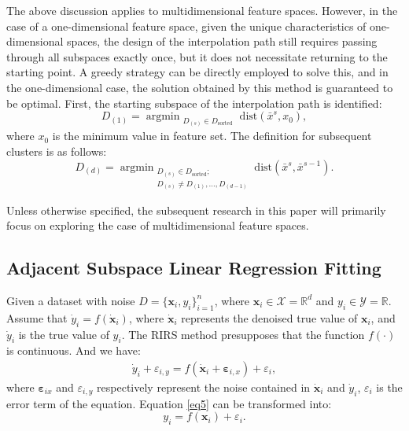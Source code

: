 \documentclass[final,3p,times]{elsarticle}
\begin{document}
The above discussion applies to multidimensional feature spaces. 
However, in the case of a one-dimensional feature space, given 
the unique characteristics of one-dimensional spaces, the design 
of the interpolation path still requires passing through all 
subspaces exactly once, but it does not necessitate returning to 
the starting point. A greedy strategy can be directly employed to 
solve this, and in the one-dimensional case, the solution obtained 
by this method is guaranteed to be optimal. First, the starting 
subspace of the interpolation path is identified:
\begin{equation}
\label{eq3}
D_{(1)}=\mathop{\text{argmin}}_{\substack{D_{(s)}\in D_{\text{sorted}}}}
\text{dist}({\bar{x}}^s,{x}_0), 
\end{equation}
where $x_0$ is the minimum value in feature set. The definition 
for subsequent clusters is as follows:
\begin{equation}
\label{eq4}
D_{(d)} = \mathop{\text{argmin}}_{\substack{D_{(s)} \in D_{\text{sorted}}; \\ 
D_{(s)} \neq D_{(1)}, \ldots, D_{(d-1)}}}\text{dist}\left(\bar{x}^s, 
\bar{x}^{s-1}\right).
\end{equation}

Unless otherwise specified, the subsequent research in this paper 
will primarily focus on exploring the case of multidimensional 
feature spaces.

\subsection{Adjacent Subspace Linear Regression Fitting}
Given a dataset with noise $D=\{\boldsymbol{x}_i,y_i\}_{i=1}^n$, 
where $\boldsymbol{x}_i\in \mathcal{X}=\mathbb{R}^d$ and 
$y_i\in\mathcal{Y}=\mathbb{R}$. Assume that 
$\dot{y}_i=f(\dot{\boldsymbol{x}}_i)$, where 
$\dot{\boldsymbol{x}}_i$ represents the denoised true value of 
$\boldsymbol{x}_i$, and $\dot{y}_i$ is the true value of 
$y_i$. The RIRS method presupposes that the function $f(\cdot)$ 
is continuous. And we have:
\begin{align} 
\label{eq5}
\dot{y}_i+\varepsilon_{i,y}=f(\dot{\boldsymbol{x}}_i+
\boldsymbol{\varepsilon}_{i,x})+\varepsilon_i, 
\end{align}
where $\boldsymbol{\varepsilon}_{ix}$ and $\varepsilon_{i,y}$ 
respectively represent the noise contained in 
$\dot{\boldsymbol{x}}_i$ and $\dot{y}_i$, $\varepsilon_i$ is the 
error term of the equation. Equation \eqref{eq5} can be transformed into:
\begin{equation} 
\label{eq6}
y_i=f(\boldsymbol{x}_i)+\varepsilon_i. 
\end{equation}
\end{document}
